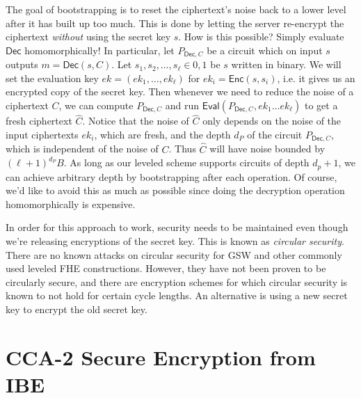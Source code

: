 The goal of bootstrapping is to reset the ciphertext's noise back to a lower level after it has built up too much. 
This is done by letting the server re-encrypt the ciphertext \emph{without} using the secret key $s$. 
How is this possible? 
Simply evaluate $\mathsf{Dec}$ homomorphically! 
In particular, let $P_{\mathsf{Dec}, C}$ be a circuit which on input $s$ outputs $m = \mathsf{Dec}(s, C)$. 
Let $s_1, s_2, \ldots, s_{\ell} \in {0,1}$ be $s$ written in binary. 
We will set the evaluation key $ek = (ek_1, \ldots, ek_{\ell})$ for $ek_i = \mathsf{Enc}(s, s_i)$, i.e. it gives us an encrypted copy of the secret key. 
Then whenever we need to reduce the noise of a ciphertext $C$, we can compute $P_{\mathsf{Dec}, C}$ and run $\mathsf{Eval}(P_{\mathsf{Dec}, C}, ek_1 \ldots ek_\ell)$ to get a fresh ciphertext $\hat{C}$. 
Notice that the noise of $\hat{C}$ only depends on the noise of the input ciphertexts $ek_i$, which are fresh, and the depth $d_P$ of the circuit $P_{\mathsf{Dec}, C}$, which is independent of the noise of $C$. 
Thus $\hat{C}$ will have noise bounded by $(\ell + 1)^{d_P} B$. 
As long as our leveled scheme supports circuits of depth $d_p+1$, we can achieve arbitrary depth by bootstrapping after each operation. 
Of course, we'd like to avoid this as much as possible since doing the decryption operation homomorphically is expensive. 


In order for this approach to work, security needs to be maintained even though we're releasing encryptions of the secret key. 
This is known as \emph{circular security}. 
There are no known attacks on circular security for GSW and other commonly used leveled FHE constructions. 
However, they have not been proven to be circularly secure, and there are encryption schemes for which circular security is known to not hold for certain cycle lengths. 
An alternative is using a new secret key to encrypt the old secret key. 


\section{CCA-2 Secure Encryption from IBE} 

